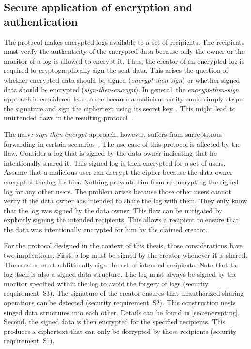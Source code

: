 \documentclass[../main.tex]{subfiles}
\begin{document}
\subsection{Secure application of encryption and authentication}
\label{sec:sign-and-encrypt}
The protocol makes encrypted logs available to a set of recipients.
The recipients must verify the authenticity of the encrypted data because only the owner or the monitor of a log is allowed to encrypt it.
Thus, the creator of an encrypted log is required to cryptographically sign the sent data.
This arises the question of whether encrypted data should be signed (\emph{encrypt-then-sign}) or whether signed data should be encrypted (\emph{sign-then-encrypt}).
In general, the \emph{encrypt-then-sign} approach is considered less secure because a malicious entity could simply stripe the signature and sign the ciphertext using its secret key~\cite{Davis2001}.
This might lead to unintended flaws in the resulting protocol~\cite{JWT2015}.

The naive \emph{sign-then-encrypt} approach, however, suffers from surreptitious forwarding in certain scenarios~\cite{Davis2001}.
The use case of this protocol is affected by the flaw.
Consider a log that is signed by the data owner indicating that he intentionally shared it.
This signed log is then encrypted for a set of users.
Assume that a malicious user can decrypt the cipher because the data owner encrypted the log for him.
Nothing prevents him from re-encrypting the signed log for any other users.
The problem arises because those other users cannot verify if the data owner has intended to share the log with them.
They only know that the log was signed by the data owner.
This flaw can be mitigated by explicitly signing the intended recipients.
This allows a recipient to ensure that the data was intentionally encrypted for him by the claimed creator.~\cite{Davis2001}

For the protocol designed in the context of this thesis, those considerations have two implications.
First, a log must be signed by the creator whenever it is shared.
The creator must additionally sign the set of intended recipients.
Note that the log itself is also a signed data structure.
The log must always be signed by the monitor specified within the log to avoid the forgery of logs (security requirement~S3).
The signature of the creator ensures that unauthorized sharing operations can be detected (security requirement~S2).
This construction nests singed data structures into each other.
Details can be found in \cref{sec:encrypting}.
Second, the signed data is then encrypted for the specified recipients.
This produces a ciphertext that can only be decrypted by those recipients (security requirement~S1).
\end{document}
